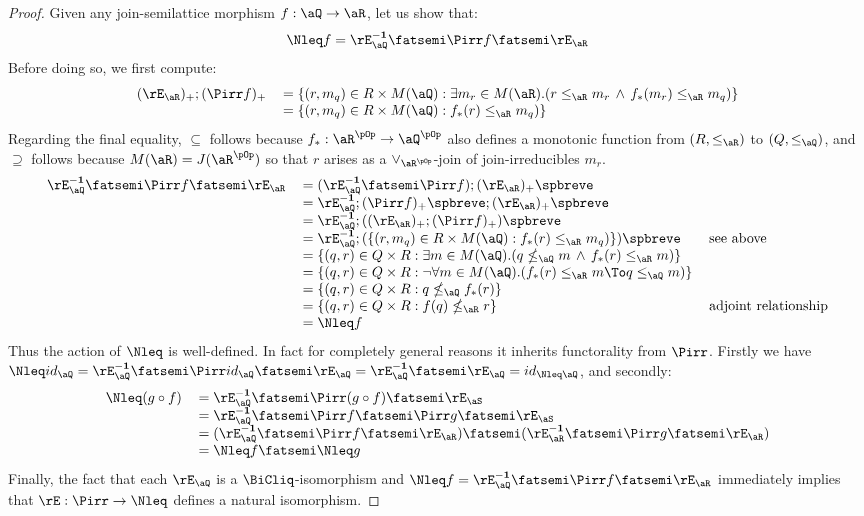 \documentclass{article}
\begin{document}
\begin{proof}
Given any join-semilattice morphism $f : \aQ \to \aR$, let us show that:
\[
\Nleq f = \rE_\aQ^{\bf-1} \fatsemi \Pirr f \fatsemi \rE_\aR
\]
Before doing so, we first compute:
\[
\begin{tabular}{lll}
$(\rE_\aR)_+ ; (\Pirr f)_+$
&
$= \{ (r,m_q) \in R \times M(\aQ) : \exists m_r \in M(\aR).( r \leq_\aR m_r \,\land\, f_*(m_r) \leq_\aR m_q )  \}$
\\&
$= \{ (r,m_q) \in R \times M(\aQ) : f_*(r) \leq_\aR m_q )  \}$
\end{tabular}
\]
Regarding the final equality, $\subseteq$ follows because $f_* : \aR^{\pOp} \to \aQ^{\pOp}$  also defines a monotonic function from $(R,\leq_\aR)$ to $(Q,\leq_\aQ)$, and $\supseteq$ follows because $M(\aR) = J(\aR^{\pOp})$ so that $r$ arises as a $\lor_{\aR^{\pOp}}$-join of join-irreducibles $m_r$.
\[
\begin{tabular}{lll}
$\rE_\aQ^{\bf-1} \fatsemi \Pirr f \fatsemi \rE_\aR$
&
$= (\rE_\aQ^{\bf-1} \fatsemi \Pirr f) ; (\rE_\aR)_+\spbreve$
\\&
$= \rE_\aQ^{\bf-1} ; (\Pirr f)_+\spbreve ; (\rE_\aR)_+\spbreve$
\\&
$= \rE_\aQ^{\bf-1} ; ((\rE_\aR)_+ ; (\Pirr f)_+)\spbreve$
\\&
$= \rE_\aQ^{\bf-1} ; ( \{ (r,m_q) \in R \times M(\aQ) : f_*(r) \leq_\aR m_q )  \})\spbreve$
& see above
\\&
$= \{ (q,r) \in Q \times R: \exists m \in M(\aQ).( q \nleq_\aQ m \,\land\, f_*(r) \leq_\aR m  ) \}$
\\&
$= \{ (q,r) \in Q \times R: \neg\forall m \in M(\aQ).( f_*(r) \leq_\aR m \To q \leq_\aQ m  ) \}$
\\&
$= \{ (q,r) \in Q \times R : q \nleq_\aQ f_*(r) \}$
\\&
$= \{ (q,r) \in Q \times R : f(q) \nleq_\aR r \}$
& adjoint relationship
\\&
$= \Nleq f$
\end{tabular}
\]
Thus the action of $\Nleq$ is well-defined. In fact for completely general reasons it inherits functorality from $\Pirr$. Firstly we have $\Nleq id_\aQ = \rE_\aQ^{\bf-1} \fatsemi \Pirr id_\aQ \fatsemi \rE_\aQ= \rE_\aQ^{\bf-1} \fatsemi \rE_\aQ = id_{\Nleq \aQ}$, and secondly:
\[
\begin{tabular}{lll}
$\Nleq(g \circ f)$
&
$= \rE_\aQ^{\bf-1} \fatsemi \Pirr (g \circ f) \fatsemi \rE_\aS$
\\&
$= \rE_\aQ^{\bf-1} \fatsemi \Pirr f \fatsemi \Pirr g \fatsemi \rE_\aS$
\\&
$= (\rE_\aQ^{\bf-1} \fatsemi \Pirr f \fatsemi \rE_\aR) \fatsemi (\rE_\aR^{\bf-1} \fatsemi \Pirr g \fatsemi \rE_\aR)$
\\&
$= \Nleq f \fatsemi \Nleq g$
\end{tabular}
\]
Finally, the fact that each $\rE_\aQ$ is a $\BiCliq$-isomorphism and $\Nleq f = \rE_\aQ^{\bf-1} \fatsemi \Pirr f \fatsemi \rE_\aR$ immediately implies that $\rE : \Pirr \to \Nleq$ defines a natural isomorphism.
\end{proof}
\end{document}
